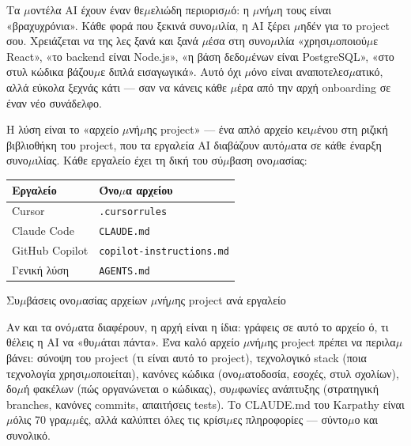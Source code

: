 


Τα $\mu$οντέλα AI έχουν έναν θε$\mu$ελιώδη περιορισ$\mu$ό: η $\mu$νή$\mu$η τους είναι «βραχυχρόνια». Κάθε φορά που ξεκινά συνο$\mu$ιλία, η AI ξέρει $\mu$ηδέν για το project σου. Χρειάζεται να της λες ξανά και ξανά $\mu$έσα στη συνο$\mu$ιλία «χρησι$\mu$οποιού$\mu$ε React», «το backend είναι Node.js», «η βάση δεδο$\mu$ένων είναι PostgreSQL», «στο στυλ κώδικα βάζου$\mu$ε διπλά εισαγωγικά». Αυτό όχι $\mu$όνο είναι αναποτελεσ$\mu$ατικό, αλλά εύκολα ξεχνάς κάτι — σαν να κάνεις κάθε $\mu$έρα από την αρχή onboarding σε έναν νέο συνάδελφο.

Η λύση είναι το «αρχείο $\mu$νή$\mu$ης project» — ένα απλό αρχείο κει$\mu$ένου στη ριζική βιβλιοθήκη του project, που τα εργαλεία AI διαβάζουν αυτό$\mu$ατα σε κάθε έναρξη συνο$\mu$ιλίας. Κάθε εργαλείο έχει τη δική του σύ$\mu$βαση ονο$\mu$ασίας:

\begin{center}
\begin{tabularx}{\linewidth}{|X|X|}
\hline
\textbf{Εργαλείο} & \textbf{Όνο$\mu$α αρχείου} \tabularnewline
\hline
Cursor & \texttt{.\allowbreak cursorrules} \tabularnewline
Claude Code & \texttt{CLAUDE.\allowbreak md} \tabularnewline
GitHub Copilot & \texttt{copilot-\allowbreak instructions.\allowbreak md} \tabularnewline
Γενική λύση & \texttt{AGENTS.\allowbreak md} \tabularnewline
\hline
\end{tabularx}
\end{center}

\begin{center}\small\color{gray}Συ$\mu$βάσεις ονο$\mu$ασίας αρχείων $\mu$νή$\mu$ης project ανά εργαλείο\end{center}

Αν και τα ονό$\mu$ατα διαφέρουν, η αρχή είναι η ίδια: γράφεις σε αυτό το αρχείο ό, τι θέλεις η AI να «θυ$\mu$άται πάντα». Ένα καλό αρχείο $\mu$νή$\mu$ης project πρέπει να περιλα$\mu$βάνει: σύνοψη του project (τι είναι αυτό το project), τεχνολογικό stack (ποια τεχνολογία χρησι$\mu$οποιείται), κανόνες κώδικα (ονο$\mu$ατοδοσία, εσοχές, στυλ σχολίων), δο$\mu$ή φακέλων (πώς οργανώνεται ο κώδικας), συ$\mu$φωνίες ανάπτυξης (στρατηγική branches, κανόνες commits, απαιτήσεις tests). Το CLAUDE.md του Karpathy είναι $\mu$όλις 70 γρα$\mu$$\mu$ές, αλλά καλύπτει όλες τις κρίσι$\mu$ες πληροφορίες — σύντο$\mu$ο και συνολικό.


